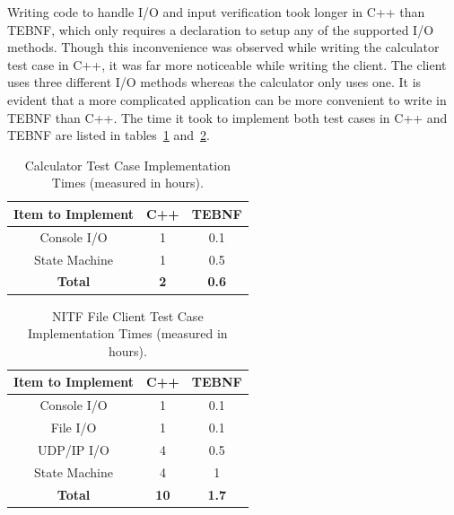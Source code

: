 \indent
Writing code to handle I/O and input verification took longer in C++ than TEBNF, which only requires a declaration to setup any of the supported I/O methods.  Though this inconvenience was observed while writing the calculator test case in C++, it was far more noticeable while writing the client.  The client uses three different I/O methods whereas the calculator only uses one.  It is evident that a more complicated application can be more convenient to write in TEBNF than C++.  The time it took to implement both test cases in C++ and TEBNF are listed in tables~\ref{calcImplementationTimes} and~\ref{testCaseNitfRecvTimes}.

\begin{table}[h]
\begin{center}
\caption[Calculator Test Case Implementation Times]{Calculator Test Case Implementation Times (measured in hours).}
\label{calcImplementationTimes}
\begin{tabular}{|c|c|c|} \hline
\textbf{Item to Implement} & \textbf{C++} & \textbf{TEBNF} \\ \hline \hline
Console I/O                & 1            & 0.1            \\ \hline
State Machine              & 1            & 0.5            \\ \hline
\textbf{Total}             & \textbf{2}   & \textbf{0.6}   \\ \hline
\end{tabular}
\end{center}
\end{table}

\begin{table}[h]
\begin{center}
\caption[NITF File Client Test Case Implementation Times]{NITF File Client Test Case Implementation Times (measured in hours).}
\label{testCaseNitfRecvTimes}
\begin{tabular}{|c|c|c|} \hline
\textbf{Item to Implement} & \textbf{C++} & \textbf{TEBNF} \\ \hline \hline
Console I/O                & 1            & 0.1            \\ \hline
File I/O                   & 1            & 0.1            \\ \hline
UDP/IP I/O                 & 4            & 0.5            \\ \hline
State Machine              & 4            & 1              \\ \hline
\textbf{Total}             & \textbf{10}  & \textbf{1.7}   \\ \hline
\end{tabular}
\end{center}
\end{table}

